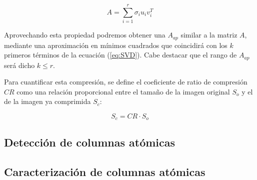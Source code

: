 \begin{equation} \label{eq:SVD}
    A = \sum^r_{i=1} \sigma_i u_i v_i^T 
\end{equation}

Aprovechando esta propiedad podremos obtener una $A_{ap}$ similar a la matriz $A$, mediante una aproximación en mínimos cuadrados que coincidirá con los $k$ primeros términos de la ecuación (\ref{eq:SVD}). Cabe destacar que el rango de $A_{ap}$ será dicho $k \leq r$. \\

\newpage

Para cuantificar esta compresión, se define el coeficiente de ratio de compresión $CR$ como una relación proporcional entre el tamaño de la imagen original $S_o$ y el de la imagen ya comprimida $S_c$:

\begin{equation} \label{cr}
   S_c = CR \cdot S_o 
\end{equation}

\newpage
\subsection{Detección de columnas atómicas}



\newpage
\subsection{Caracterización de columnas atómicas}
